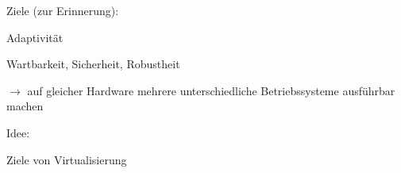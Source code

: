 \documentclass[a4paper]{article}
\begin{document}
\begin{multicols}{3}
    \begin{itemize*}
        \item
        Ziele (zur Erinnerung):
        \begin{itemize*}
            \item Adaptivität
            \item Wartbarkeit, Sicherheit, Robustheit
            \item $\rightarrow$ auf gleicher Hardware mehrere unterschiedliche Betriebssysteme ausführbar machen
        \end{itemize*}
        \item
        Idee:
    \end{itemize*}

    Ziele von Virtualisierung


\end{multicols}
\end{document}
